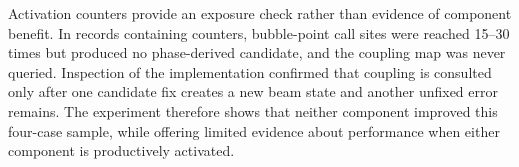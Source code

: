 Activation counters provide an exposure check rather than evidence of
component benefit. In records containing counters, bubble-point call sites
were reached 15--30 times but produced no phase-derived candidate, and the
coupling map was never queried. Inspection of the implementation confirmed
that coupling is consulted only after one candidate fix creates a new beam
state and another unfixed error remains. The experiment therefore shows that
neither component improved this four-case sample, while offering limited
evidence about performance when either component is productively activated.
